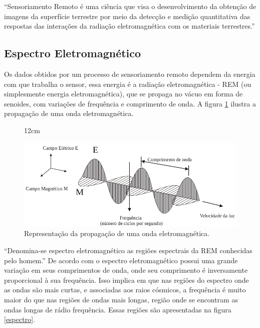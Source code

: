 ``Sensoriamento Remoto é uma ciência que visa o desenvolvimento da obtenção de imagens da superfície terrestre por meio da detecção e
medição quantitativa das respostas das interações da radiação eletromagnética com os
materiais terrestres.'' \cite[p.3]{meneses2012introduccao}

\subsection{Espectro Eletromagnético}
Os dados obtidos por um processo de sensoriamento remoto dependem da energia com que trabalha o sensor, essa energia é a radiação eletromagnética - REM (ou simplesmente energia eletromagnética), que se propaga no vácuo em forma de senoides, com variações de frequência e comprimento de onda. A figura \ref{wave} ilustra a propagação de uma onda eletromagnética.

\begin{figure}[!ht]{12cm}
  \caption{Representação da propagação de uma onda eletromagnética.} \label{wave}
  \includegraphics[width=1.1\hsize]{figuras/wave.png}
\end{figure}

``Denomina-se espectro eletromagnético as regiões espectrais da REM conhecidas pelo
homem.'' \cite[p.18]{meneses2012introduccao}
De acordo com  o espectro eletromagnético possui uma grande variação em seus comprimentos de onda, onde seu comprimento é inversamente proporcional à sua frequência. Isso implica em que nas regiões do espectro onde as ondas são mais curtas, e associadas aos raios cósmicos, a frequência é muito maior do que nas regiões de ondas mais longas, região onde se encontram as ondas longas de rádio frequência.
Essas regiões são apresentadas na figura \ref{espectro}.

